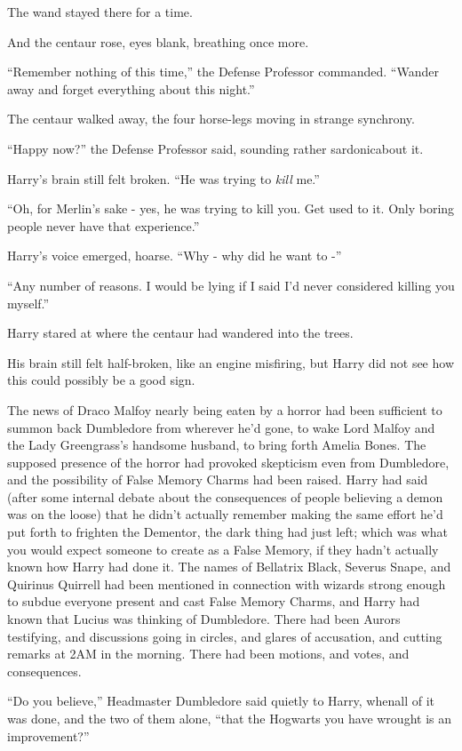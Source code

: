 The wand stayed there for a time.

And the centaur rose, eyes blank, breathing once more.

“Remember nothing of this time,” the Defense Professor commanded. “Wander away and forget everything about this night.”

The centaur walked away, the four horse-legs moving in strange synchrony.

“Happy now?” the Defense Professor said, sounding rather sardonicabout it.

Harry's brain still felt broken. “He was trying to \emph{kill} me.”

“Oh, for Merlin's sake - yes, he was trying to kill you. Get used to it. Only boring people never have that experience.”

Harry's voice emerged, hoarse. “Why - why did he want to -”

“Any number of reasons. I would be lying if I said I'd never considered killing you myself.”

Harry stared at where the centaur had wandered into the trees.

His brain still felt half-broken, like an engine misfiring, but Harry did not see how this could possibly be a good sign.

\replacement{\sbreak}{}

The news of Draco Malfoy nearly being eaten by a horror had been sufficient to summon back Dumbledore from wherever he'd gone, to wake Lord Malfoy and the Lady Greengrass's handsome husband, to bring forth Amelia Bones. The supposed presence of the horror had provoked skepticism even from Dumbledore, and the possibility of False Memory Charms had been raised. Harry had said (after some internal debate about the consequences of people believing a demon was on the loose) that he didn't actually remember making the same effort he'd put forth to frighten the Dementor, the dark thing had just left; which was what you would expect someone to create as a False Memory, if they hadn't actually known how Harry had done it. The names of Bellatrix Black, Severus Snape, and Quirinus Quirrell had been mentioned in connection with wizards strong enough to subdue everyone present and cast False Memory Charms, and Harry had known that Lucius was thinking of Dumbledore. There had been Aurors testifying, and discussions going in circles, and glares of accusation, and cutting remarks at 2AM in the morning. There had been motions, and votes, and consequences.

“Do you believe,” Headmaster Dumbledore said quietly to Harry, whenall of it was done, and the two of them alone, “that the Hogwarts you have wrought is an improvement?”

